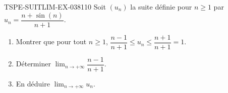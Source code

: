 \begin{exercice}{TSPE-SUITLIM-EX-038}{1}{10}
Soit $(u_n)$ la suite définie pour $n \geq 1$ par $u_n = \dfrac{n + \sin(n)}{n + 1}$.
\begin{enumerate}
  \item Montrer que pour tout $n \geq 1$, $\dfrac{n - 1}{n + 1} \leq u_n \leq \dfrac{n + 1}{n + 1} = 1$.
  \item Déterminer $\lim_{n \to +\infty} \dfrac{n-1}{n+1}$.
  \item En déduire $\lim_{n \to +\infty} u_n$.
\end{enumerate}
\end{exercice}
